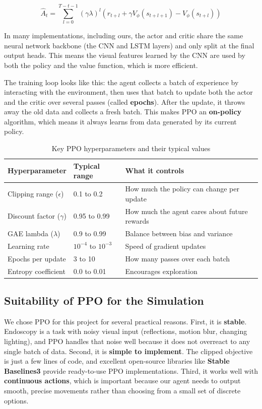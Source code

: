 $$\hat{A}_t = \sum_{l=0}^{T-t-1} (\gamma \lambda)^l \left(r_{t+l} + \gamma V_\phi(s_{t+l+1}) - V_\phi(s_{t+l})\right)$$

In many implementations, including ours, the actor and critic share the same neural network backbone (the CNN and LSTM layers) and only split at the final output heads. This means the visual features learned by the CNN are used by both the policy and the value function, which is more efficient.

The training loop looks like this: the agent collects a batch of experience by interacting with the environment, then uses that batch to update both the actor and the critic over several passes (called \textbf{epochs}). After the update, it throws away the old data and collects a fresh batch. This makes PPO an \textbf{on-policy} algorithm, which means it always learns from data generated by its current policy.

\begin{table}[H]
\centering
\caption{Key PPO hyperparameters and their typical values}
\begin{tabular}{|L{5cm}C{4.5cm}R{5cm}|}
\hline
\textbf{Hyperparameter} & \textbf{Typical range} & \textbf{What it controls} \\ \hline
Clipping range ($\epsilon$) & 0.1 to 0.2 & How much the policy can change per update \\ \hline
Discount factor ($\gamma$) & 0.95 to 0.99 & How much the agent cares about future rewards \\ \hline
GAE lambda ($\lambda$) & 0.9 to 0.99 & Balance between bias and variance \\ \hline
Learning rate & $10^{-4}$ to $10^{-3}$ & Speed of gradient updates \\ \hline
Epochs per update & 3 to 10 & How many passes over each batch \\ \hline
Entropy coefficient & 0.0 to 0.01 & Encourages exploration \\ \hline
\end{tabular}
\label{tab:ppo_hyperparams}
\end{table}

\subsection{Suitability of PPO for the Simulation}

We chose PPO for this project for several practical reasons. First, it is \textbf{stable}. Endoscopy is a task with noisy visual input (reflections, motion blur, changing lighting), and PPO handles that noise well because it does not overreact to any single batch of data. Second, it is \textbf{simple to implement}. The clipped objective is just a few lines of code, and excellent open-source libraries like \textbf{Stable Baselines3} provide ready-to-use PPO implementations. Third, it works well with \textbf{continuous actions}, which is important because our agent needs to output smooth, precise movements rather than choosing from a small set of discrete options.

